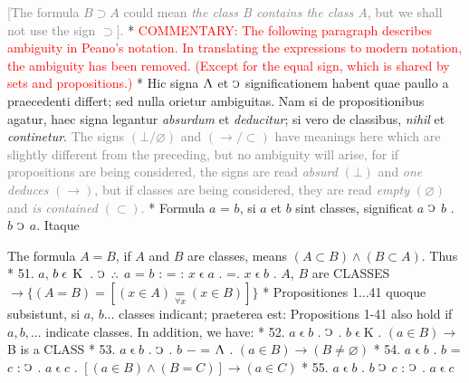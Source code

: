 \documentclass{book}
\newcommand{\C}{\mathop{\sbox0{$\displaystyle$$\reflectbox{C}$} %
\raisebox{-\height+\ht0-0.05cm}[\ht0][\dp0]{\scalebox{0.8}[0.8]{\copy0}}}\displaylimits} %
\newcommand{\pppNoSpace}{\leavevmode\lower0ex\hbox{.}\kern-0.1em\raise0.7ex\hbox{.}\kern-0.1em\lower0ex\hbox{.}} %
\newcommand{\abs}{\mathop{\rotatebox[origin=c]{180}{V}}}
\newcommand{\smallIn}{\ensuremath{\mathrel{\epsilon}}}
\newcommand{\K}{\mathop{\thinspace \text{K} \thinspace}}
\newcommand\irrelavent[1]{\textcolor{gray}{#1}}
\newcommand\commentary[1]{\textcolor{red}{COMMENTARY: #1}}
\newenvironment{translateTwoCol}
               { %
                 \columnratio{0.5, 0.5} \begin{paracol}{2}
                 \newcommand{\LAT}{\switchcolumn[0]*}
                 \newcommand{\ENG}{\switchcolumn[1]}
               }
               { %
                 \let\ENG\undefined
                 \let\LAT\undefined
                 \end{paracol}
               }
\begin{document}
\begin{translateTwoCol}
\ENG
\quad \irrelavent{[The formula $B \supset A$ could mean {\emph{the class B contains the class A}}, but we shall not use the sign $\supset$].}
\LAT
\ENG
\commentary{The following paragraph describes ambiguity in Peano's notation.  In translating the expressions to modern notation, the ambiguity has been removed.  (Except for the equal sign, which is shared by sets and propositions.) }
\LAT
Hic signa $\abs$ et $\C$ significationem habent quae paullo a praecedenti differt; sed nulla orietur ambiguitas. Nam si de propositionibus agatur, haec signa legantur {\emph{absurdum}} et {\emph{deducitur}}; si vero de classibus, {\emph{nihil}} et {\emph{continetur}}.
\ENG
\irrelavent{The signs $(\bot / \varnothing)$ and $(\rightarrow / \subset)$ have meanings here which are slightly different from the preceding, but no ambiguity will arise, for if propositions are being considered, the signs are read \emph{absurd} $(\bot)$ and \emph{one deduces} $(\rightarrow)$, but if classes are being considered, they are read \emph{empty} $(\varnothing)$ and \emph{is contained} $(\subset)$.}
\LAT
\quad Formula $a$ = $b$, si $a$ et $b$ sint classes, significat $a$ $\C$ $b$ . $b$ $\C$ $a$. Itaque
\ENG
\raggedright
\quad The formula $A = B$, if $A$ and $B$ are classes, means $(A \subset B) \wedge (B \subset A)$. Thus
\LAT
51. \hspace{0.67cm} $a$, $b \smallIn \K$ . $\C$ $\pppNoSpace$ $a$ = $b$ : = : $x \smallIn a$ . =\scalebox{0.7}{$x$}\thinspace . $x \smallIn b$
\ENG
51. \hspace{0.67cm} $A$, $B$ are \scriptsize{CLASSES} \normalsize $\rightarrow \{(A = B) = [(x \in A) \underset{\forall x}=  (x \in B)]\}$
\LAT
Propositiones 1...41 quoque subsistunt, si $a$, $b$... classes indicant; praeterea est:
\ENG
Propositions 1-41 also hold if $a,b,...$ indicate classes. In addition, we have:
\LAT
52. \hspace{0.67cm} $a\smallIn b$ . $\C$ . $b \smallIn \text{K}$
\ENG
52. \hspace{0.67cm} $(a \in B) \rightarrow$ B is a \scriptsize{CLASS} \normalsize
\LAT
53. \hspace{0.67cm} $a\smallIn b$ . $\C$ . $b$ $-$ = $\abs$
\ENG
53. \hspace{0.67cm} $(a \in B) \rightarrow (B \not= \varnothing)$
\LAT
54. \hspace{0.67cm} $a \smallIn b$ . $b$ = $c$ : $\C$ . $a \smallIn c$
\ENG
54. \hspace{0.67cm} $[(a \in B) \wedge (B = C)] \rightarrow (a \in C)$
\LAT
55. \hspace{0.67cm} $a \smallIn b$ . $b$ $\C$ $c$ : $\C$ . $a \smallIn c$

\end{translateTwoCol}
\end{document}
